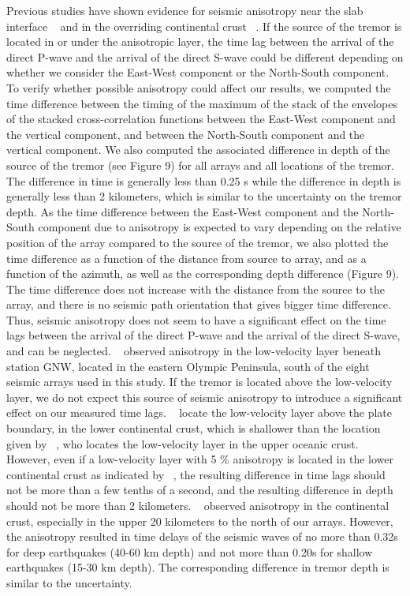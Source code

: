 \documentclass[draft]{agujournal2019}
\begin{document}
Previous studies have shown evidence for seismic anisotropy near the slab interface ~\cite{NIK_2009} and in the overriding continental crust ~\cite{CAS_1996}. If the source of the tremor is located in or under the anisotropic layer, the time lag between the arrival of the direct P-wave and the arrival of the direct S-wave could be different depending on whether we consider the East-West component or the North-South component. To verify whether possible anisotropy could affect our results, we computed the time difference between the timing of the maximum of the stack of the envelopes of the stacked cross-correlation functions between the East-West component and the vertical component, and between the North-South component and the vertical component. We also computed the associated difference in depth of the source of the tremor (see Figure 9) for all arrays and all locations of the tremor. The difference in time is generally less than 0.25 s while the difference in depth is generally less than 2 kilometers, which is similar to the uncertainty on the tremor depth. As the time difference between the East-West component and the North-South component due to anisotropy is expected to vary depending on the relative position of the array compared to the source of the tremor, we also plotted the time difference as a function of the distance from source to array, and as a function of the azimuth, as well as the corresponding depth difference (Figure 9). The time difference does not increase with the distance from the source to the array, and there is no seismic path orientation that gives bigger time difference. Thus, seismic anisotropy does not seem to have a significant effect on the time lags between the arrival of the direct P-wave and the arrival of the direct S-wave, and can be neglected. ~ observed anisotropy in the low-velocity layer beneath station GNW, located in the eastern Olympic Peninsula, south of the eight seismic arrays used in this study. If the tremor is located above the low-velocity layer, we do not expect this source of seismic anisotropy to introduce a significant effect on our measured time lags. ~ locate the low-velocity layer above the plate boundary, in the lower continental crust, which is shallower than the location given by ~, who locates the low-velocity layer in the upper oceanic crust. However, even if a low-velocity layer with 5 \% anisotropy is located in the lower continental crust as indicated by ~, the resulting difference in time lags should not be more than a few tenths of a second, and the resulting difference in depth should not be more than 2 kilometers. ~ observed anisotropy in the continental crust, especially in the upper 20 kilometers to the north of our arrays. However, the anisotropy resulted in time delays of the seismic waves of no more than 0.32s for deep earthquakes (40-60 km depth) and not more than 0.20s for shallow earthquakes (15-30 km depth). The corresponding difference in tremor depth is similar to the uncertainty. \\
\end{document}
